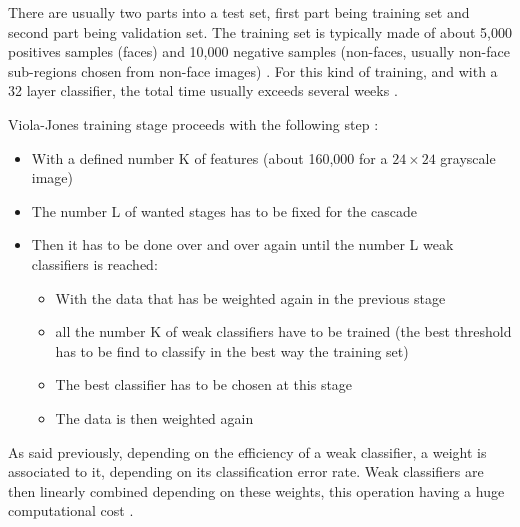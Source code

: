 \vspace{\baselineskip}
\noindent There are usually two parts into a test set, first part being training set and second part being validation set. The training set is typically made of about 5,000 positives samples (faces) and 10,000 negative samples (non-faces, usually non-face sub-regions chosen from non-face images) \cite{DIN08}. For this kind of training, and with a 32 layer classifier, the total time usually exceeds several weeks \cite{VIO01}.
\newline

\noindent Viola-Jones training stage proceeds with the following step \cite{DIN08}:

\begin{itemize}
  \item With a defined number K of features (about 160,000 for a $ 24\times24 $ grayscale image)
  \item The number L of wanted stages has to be fixed for the cascade
  \item Then it has to be done over and over again until the number L weak classifiers is reached:
  \begin{itemize}
  	\item With the data that has be weighted again in the previous stage
	\item all the number K of weak classifiers have to be trained (the best threshold has to be find to classify in the best way the training set)
	\item The best classifier has to be chosen at this stage
	\item The data is then weighted again
  \end{itemize}
\end{itemize}

\noindent As said previously, depending on the efficiency of a weak classifier, a weight is associated to it, depending on its classification error rate. Weak classifiers are then linearly combined depending on these weights, this operation having a huge computational cost \cite{DIN08}.
\newline





